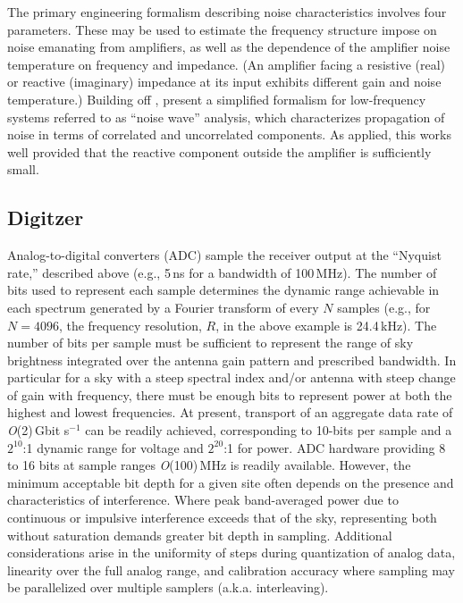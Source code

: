 The primary engineering formalism describing noise characteristics involves four parameters.  These may be used to estimate the frequency structure impose on noise emanating from amplifiers, as well as the dependence of the amplifier noise temperature on frequency and impedance.  (An amplifier facing a resistive (real) or reactive (imaginary) impedance at its input exhibits different gain and noise temperature.)  Building off \cite{hu04}, \cite{rogers12}  present a simplified formalism for low-frequency systems referred to as ``noise wave'' analysis, which characterizes propagation of noise in terms of correlated and uncorrelated components.  As applied, this works well provided that the reactive component outside the amplifier is sufficiently small. 

\subsection{Digitzer}
  
Analog-to-digital converters (ADC) sample the receiver output at the ``Nyquist rate,'' described above (e.g., 5\,ns for a bandwidth of 100\,MHz).  The number of bits used to represent each sample determines the dynamic range achievable in each spectrum generated by a Fourier transform of every $N$ samples (e.g., for $N=4096$, the frequency resolution, $R$, in the above example is 24.4\,kHz).   The number of bits per sample must be sufficient to represent the range of sky brightness integrated over the antenna gain pattern and prescribed bandwidth. In particular for a sky with a steep spectral index and/or antenna with steep change of gain with frequency, there must be enough bits to represent power at both the highest and lowest frequencies.  At present, transport of an aggregate data rate of {\it O}(2)\,Gbit s$^{-1}$ can be readily achieved, corresponding to 10-bits per sample and a $2^{10}$:1 dynamic range for voltage and $2^{20}$:1 for power.
ADC hardware providing 8 to 16 bits at sample ranges {\it O}(100)\,MHz is readily available.  However, the minimum acceptable bit depth for a given site often depends on the presence and characteristics of interference.  Where peak band-averaged power due to continuous or impulsive interference exceeds that of the sky, representing both without saturation demands greater bit depth in sampling.  Additional considerations arise in  the uniformity of steps during quantization of analog data, linearity over the full analog range, and calibration accuracy where sampling may be parallelized over multiple samplers (a.k.a. interleaving).
 

